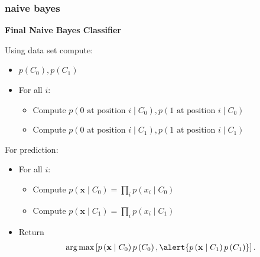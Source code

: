 \documentclass[handout,compress]{beamer}
\newcommand{\bv}[1]{\mathbf{#1}}
\DeclareMathOperator*{\argmax}{arg\,max}
\begin{document}
\begin{frame}
	\frametitle{naive bayes}
	\begin{center}
		\textbf{Final Naive Bayes Classifier}
	\end{center}
	Using data set compute:
	\begin{itemize}
		\item $p(C_0),p(C_1)$
		\item For all $i$:
		\begin{itemize}
			\item Compute $p(0 \text{ at position $i$} \mid C_0), p(1\text{ at position $i$}  \mid C_0)$
			\item Compute $p(0 \text{ at position $i$} \mid C_1), p(1\text{ at position $i$}  \mid C_1)$
		\end{itemize}
	\end{itemize}

	For prediction:
\begin{itemize}
	\item For all $i$:
	\begin{itemize}
		\item Compute $p(\bv{x}\mid C_0) = \prod_i p(x_i \mid C_0)$
		\item Compute $p(\bv{x}\mid C_1) = \prod_i p(x_i \mid C_1)$
	\end{itemize}
	\item Return 
	\begin{align*}
			\argmax \left[ p\left(\bv{x} \mid C_0\right)p\left(C_0\right), \alert{p\left(\bv{x}\mid C_1 \right)p\left(C_1\right)} \right].
	\end{align*}
\end{itemize}
\end{frame} 
\end{document}
